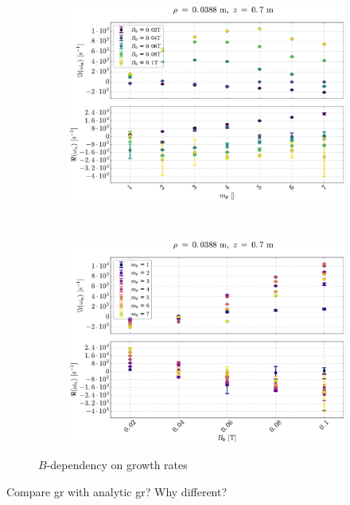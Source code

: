 \begin{figure}[htbp]
    \centering
    \begin{subfigure}[h]{1.00\textwidth}
        \centering
        \includegraphics[width=1.0\textwidth]{fig/results/growthRates/growthRatesB0}
        \label{fig:grB}
    \end{subfigure}%
    \\
    \begin{subfigure}[h]{1.00\textwidth}
        \centering
        \includegraphics[width=1.0\textwidth]{fig/results/growthRates/growthRatesB0ModeNr}
        \label{fig:grBModeNr}
    \end{subfigure}
    \caption{$B$-dependency on growth rates}
\end{figure}
%
Compare gr with analytic gr?
Why different?

